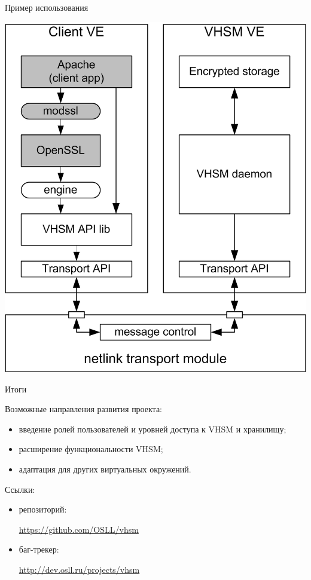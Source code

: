 \documentclass[utf8, 11pt]{beamer}
\begin{document}
\begin{frame}{Пример использования}
\begin{center}
\includegraphics[scale=0.70]{img3-3}
\end{center}
\end{frame}

\begin{frame}{Итоги}

Возможные направления развития проекта:
\begin{itemize}
\item введение ролей пользователей и уровней доступа к VHSM и хранилищу;
\item расширение функциональности VHSM;
\item адаптация для других виртуальных окружений.
\end{itemize}

\vspace*{\fill}

Ссылки:
\begin{itemize}
\item репозиторий:

\url{https://github.com/OSLL/vhsm}

\item баг-трекер:

\url{http://dev.osll.ru/projects/vhsm}
\end{itemize}

\vspace*{\fill}

\end{frame}
\end{document}
